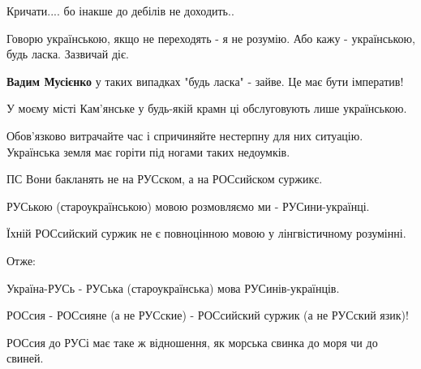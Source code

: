 \begin{itemize}
Кричати.... бо інакше до дебілів не доходить..

 
Говорю українською, якщо не переходять - я не розумію. Або кажу - українською, будь ласка. Зазвичай діє.

\begin{itemize}
 
\textbf{Вадим Мусієнко} у таких випадках "будь ласка" - зайве.
Це має бути імператив!
\end{itemize}

 
У моєму місті Кам'янське у будь-якій крамн ці обслуговують лише українською.

 

Обов'язково витрачайте час і спричиняйте нестерпну для них ситуацію. Українська
земля має горіти під ногами таких недоумків.

ПС Вони бакланять не на РУСском, а на РОСсийском суржикє.

РУСькою (староукраїнською) мовою розмовляємо ми - РУСини-українці.

Їхній РОСсийский суржик не є повноцінною мовою у лінгвістичному розумінні.

Отже:

Україна-РУСь - РУСька (староукраїнська) мова РУСинів-українців.

РОСсия - РОСсияне (а не РУСские) - РОСсийский суржик (а не РУСский язик)!

РОСсия до РУСі має таке ж відношення, як морська свинка до моря чи до свиней.


\end{itemize}
